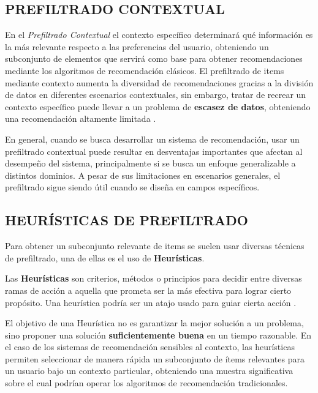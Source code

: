 \newpage

\subsection{PREFILTRADO CONTEXTUAL}

En el \textit{Prefiltrado Contextual} el contexto específico determinará qué información es la más relevante respecto a las preferencias del usuario, obteniendo un subconjunto de elementos que servirá como base para obtener recomendaciones mediante los algoritmos de recomendación clásicos.
El prefiltrado de items mediante contexto aumenta la diversidad de recomendaciones gracias a la división de datos en diferentes escenarios contextuales, sin embargo, tratar de recrear un contexto específico puede llevar a un problema de \textbf{escasez de datos}, obteniendo una recomendación altamente limitada \parencite{mateos2024systematic}.

En general, cuando se busca desarrollar un sistema de recomendación, usar un prefiltrado contextual puede resultar en desventajas importantes que afectan al desempeño del sistema, principalmente si se busca un enfoque generalizable a distintos dominios. A pesar de sus limitaciones en escenarios generales, el prefiltrado sigue siendo útil cuando se diseña en campos específicos.

\subsection{HEURÍSTICAS DE PREFILTRADO}

Para obtener un subconjunto relevante de items se suelen usar diversas técnicas de prefiltrado, una de ellas es el uso de \textbf{Heurísticas}.

\begin{definition}
    Las \textbf{Heurísticas} son criterios, métodos o principios para decidir entre diversas ramas de acción a aquella que prometa ser la más efectiva para lograr cierto propósito. Una heurística podría ser un atajo usado para guiar cierta acción \parencite{Pearl1984}.
\end{definition}

El objetivo de una Heurística no es garantizar la mejor solución a un problema, sino proponer una solución \textbf{suficientemente buena} en un tiempo razonable. En el caso de los sistemas de recomendación sensibles al contexto, las heurísticas permiten seleccionar de manera rápida un subconjunto de ítems relevantes para un usuario bajo un contexto particular, obteniendo una muestra significativa sobre el cual podrían operar los algoritmos de recomendación tradicionales.
